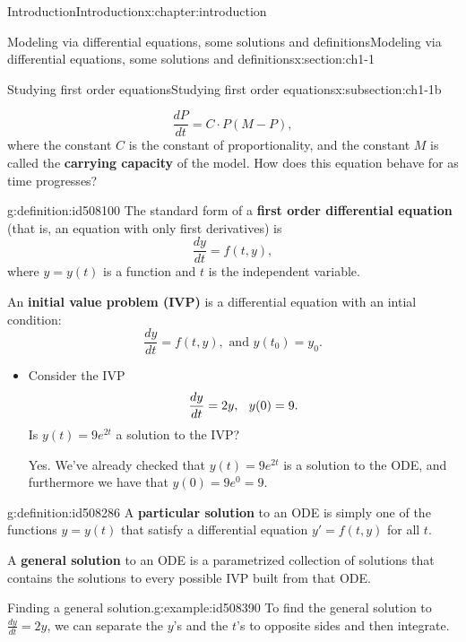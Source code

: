 \documentclass[oneside,10pt,]{book}
\newcommand{\terminology}[1]{\textbf{#1}}
\numberwithin{equation}{section}
\numberwithin{equation}{section}
\begin{document}
\begin{chapterptx}{Introduction}{}{Introduction}{}{}{x:chapter:introduction}
\begin{sectionptx}{Modeling via differential equations, some solutions and definitions}{}{Modeling via differential equations, some solutions and definitions}{}{}{x:section:ch1-1}
\begin{subsectionptx}{Studying first order equations}{}{Studying first order equations}{}{}{x:subsection:ch1-1b}
\begin{itemize}[label=\textbullet]
\begin{equation*}
\frac{dP}{dt} = C \cdot P(M - P),
\end{equation*}
where the constant \(C\) is the constant of proportionality, and the constant \(M\) is called the \terminology{carrying capacity} of the model. How does this equation behave for as time progresses?%
\end{itemize}
\begin{definition}{}{g:definition:id508100}%
The standard form of a \terminology{first order differential equation} (that is, an equation with only first derivatives) is%
\begin{equation*}
\frac{dy}{dt} = f(t,y),
\end{equation*}
where \(y = y(t)\) is a function and \(t\) is the independent variable.%
\par
An \terminology{initial value problem (IVP)} is a differential equation with an intial condition:%
\begin{equation*}
\frac{dy}{dt} = f(t, y), \text{ and } y(t_0) = y_0.
\end{equation*}
%
\end{definition}
%
\begin{itemize}[label=\textbullet]
\item{}Consider the IVP%
\begin{equation*}
\frac{dy}{dt} = 2y, \hspace{.1in} y(0) =9.
\end{equation*}
Is \(y(t) = 9e^{2t}\) a solution to the IVP?%
\par
Yes. We've already checked that \(y(t) = 9e^{2t}\) is a solution to the ODE, and furthermore we have that \(y(0) = 9e^{0} = 9\).%
\end{itemize}
\begin{definition}{}{g:definition:id508286}%
A \terminology{particular solution} to an ODE is simply one of the functions \(y = y(t)\) that satisfy a differential equation \(y' = f(t,y)\) for all \(t\).%
\par
A \terminology{general solution} to an ODE is a parametrized collection of solutions that contains the solutions to every possible IVP built from that ODE.%
\end{definition}
\begin{example}{Finding a general solution.}{g:example:id508390}%
 To find the general solution to \(\frac{dy}{dt} = 2y\), we can separate the \(y\)'s and the \(t\)'s to opposite sides and then integrate.%
\begin{align*}

\end{align*}
\end{example}
\end{subsectionptx}
\end{sectionptx}
\end{chapterptx}
\end{document}

